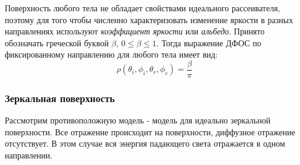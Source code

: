 \documentclass[12pt]{article}
\begin{document}
Поверхность любого тела не обладает свойствами идеального рассеивателя,
поэтому для того чтобы численно характеризовать изменение яркости
в разных направлениях используют \textit{коэффициент яркости} или \textit{альбедо}.
Принято обозначать греческой буквой $\beta$, $0\leq\beta\leq1$.
Тогда выражение ДФОС по фиксированному направлению для любого тела имеет вид:
\begin{equation}
  \rho(\theta_i,\phi_i,\theta_r,\phi_r)=\frac{\beta}{\pi}
\end{equation}

\subsubsection{Зеркальная поверхность}

Рассмотрим противоположную модель - модель для идеально зеркальной поверхности.
Все отражение происходит на поверхности, диффузное отражение отсутствует.
В этом случае вся энергия падающего света отражается в одном направлении.
\end{document}
